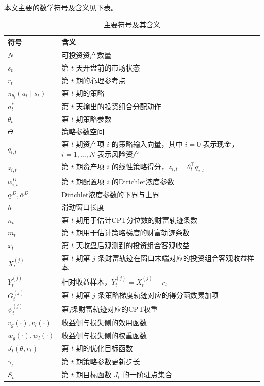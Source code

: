 \documentclass{sufethesismas}
\begin{document}
本文主要的数学符号及含义见下表。
\begin{table}[H]
\centering
\caption{主要符号及其含义}
\begin{tabular}{p{} p{}}
\hline
符号 & 含义 \\
\hline
$N$ & 可投资资产数量 \\
$s_t$ & 第 $t$ 天开盘前的市场状态 \\
$r_t$ & 第 $t$ 期的心理参考点 \\
$\pi_{\theta_t}(a_t\mid s_t)$ & 第 $t$ 期的策略 \\
$a_t^*$ & 第 $t$ 天输出的投资组合分配动作 \\
$\theta_t$ & 第 $t$ 期策略参数 \\
$\Theta$ & 策略参数空间 \\
$q_{i,t}$ & 第 $t$ 期资产项 $i$ 的策略输入向量，其中 $i=0$ 表示现金，$i=1,\dots,N$ 表示风险资产 \\
$z_{i,t}$ & 第 $t$ 期资产项 $i$ 的线性策略得分，$z_{i,t}=\theta_t^\top q_{i,t}$ \\
$\alpha^D_{i,t}$ & 第 $t$ 期配置项 $i$ 的Dirichlet浓度参数 \\
$\underline{\alpha}^D,\overline{\alpha}^D$ & Dirichlet浓度参数的下界与上界 \\
$h$ & 滑动窗口长度 \\
$n_t$ & 第 $t$ 期用于估计CPT分位数的财富轨迹条数 \\
$m_t$ & 第 $t$ 期用于估计策略梯度的财富轨迹条数 \\
$x_t$ & 第 $t$ 天收盘后观测到的投资组合客观收益 \\
$X_t^{(j)}$ & 第 $t$ 期第 $j$ 条财富轨迹在窗口末端对应的投资组合客观收益样本 \\
$Y_t^{(j)}$ & 相对收益样本，$Y_t^{(j)}=X_t^{(j)}-r_t$ \\
$G_t^{(j)}$ & 第 $t$ 期第 $j$ 条策略梯度轨迹对应的得分函数累加项 \\
$\psi_t^{(j)}$ & 第$j$条财富轨迹对应的CPT权重 \\
$v_g(\cdot),v_l(\cdot)$ & 收益侧与损失侧的效用函数 \\
$w_g(\cdot),w_l(\cdot)$ & 收益侧与损失侧的权重函数 \\
$J_t(\theta,r_t)$ & 第 $t$ 期的优化目标函数 \\
$\gamma_t$ & 第 $t$ 期策略参数更新步长 \\
$S_t$ & 第 $t$ 期目标函数 $J_t$ 的一阶驻点集合 \\
\hline
\end{tabular}
\end{table}
\end{document}
